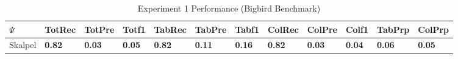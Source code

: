 \begin{table}
\caption{Experiment 1 Performance (Bigbird Benchmark)}
\label{tab:exp1-bigbird}
\begin{tabular}{llllllllllll}
\toprule
$\Psi$ & TotRec & TotPre & Totf1 & TabRec & TabPre & Tabf1 & ColRec & ColPre & Colf1 & TabPrp & ColPrp \\
\midrule
Skalpel & \textbf{0.82} & \textbf{0.03} & \textbf{0.05} & \textbf{0.82} & \textbf{0.11} & \textbf{0.16} & \textbf{0.82} & \textbf{0.03} & \textbf{0.04} & \textbf{0.06} & \textbf{0.05} \\
\bottomrule
\end{tabular}
\end{table}
